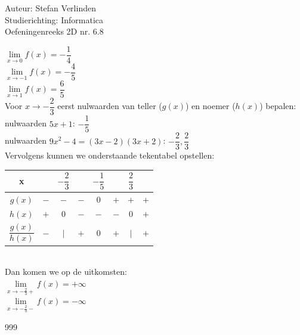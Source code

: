\documentclass[a4paper]{article}
\begin{document}
  
\noindent \large Auteur: Stefan Verlinden \\
\noindent \large Studierichting: Informatica\\
\noindent \large Oefeningenreeks 2D nr. 6.8\\

\medskip

\normalsize

$ \lim\limits_{x\to0}f(x) = -\dfrac{1}{4} $\\

$ \lim\limits_{x\to-1}f(x) = -\dfrac{4}{5} $\\

$ \lim\limits_{x\to1}f(x) = \dfrac{6}{5} $\\

Voor $ x\to-\dfrac{2}{3} $ eerst nulwaarden van teller ($ g(x) $) en noemer ($ h(x) $) bepalen:\\

\qquad nulwaarden $ 5x+1 $: $ -\dfrac{1}{5} $\\

\qquad nulwaarden $ 9x^2-4=(3x-2)(3x+2) $: $ -\dfrac{2}{3}, \dfrac{2}{3} $\\

Vervolgens kunnen we onderstaande tekentabel opstellen:\\

\begin{tabular}{c|ccccccc}
x	&	&	$ -\dfrac{2}{3} $	&	& 	$ - \dfrac{1}{5} $	&	&	$ \dfrac{2}{3} $\\
\hline
$ g(x) $	&	$-$	&	$-$	&	$-$	&	$0$	&	$+$	&	$+$	&	$+$\\
$ h(x) $&	$+$	&	$0$	&	$-$	&	$-$	&	$-$	&	$0$	&	$+$\\
\hline
$ \dfrac{g(x)}{h(x)} $	&	$-$	&	$|$	&	$+$	&	$0$	&	$+$	&	$|$	&	$+$\\

\end{tabular}\\

Dan komen we op de uitkomsten:\\

$ \lim\limits_{x\to-\tfrac{2}{3}+}f(x) = +\infty $\\

$ \lim\limits_{x\to-\tfrac{2}{3}-}f(x) = -\infty $\\

\begin{thebibliography}{999}
\end{thebibliography}
\end{document}
